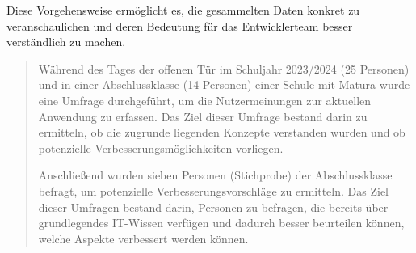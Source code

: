 Diese Vorgehensweise ermöglicht es, die gesammelten Daten konkret zu veranschaulichen und deren Bedeutung für das Entwicklerteam
besser verständlich zu machen.

\begin{quote}
    Während des Tages der offenen Tür im Schuljahr 2023/2024 (25 Personen) und in einer Abschlussklasse (14 Personen)
    einer Schule mit Matura wurde eine Umfrage durchgeführt, um die Nutzermeinungen zur aktuellen Anwendung zu erfassen.
    Das Ziel dieser Umfrage bestand darin zu ermitteln, ob die zugrunde liegenden Konzepte verstanden wurden und ob
    potenzielle Verbesserungsmöglichkeiten vorliegen.

    Anschließend wurden sieben Personen (Stichprobe) der Abschlussklasse befragt, um potenzielle Verbesserungsvorschläge
    zu ermitteln. Das Ziel dieser Umfragen bestand darin, Personen zu befragen, die bereits über grundlegendes IT-Wissen
    verfügen und dadurch besser beurteilen können, welche Aspekte verbessert werden können.
\end{quote}

